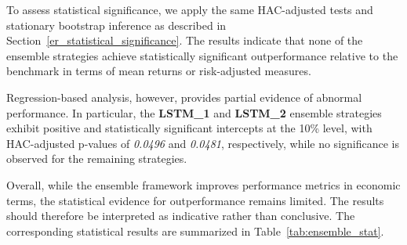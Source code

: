 \documentclass[]{elsarticle}
\begin{document}
\linespread{1.5}\selectfont

To assess statistical significance, we apply the same HAC-adjusted tests and stationary bootstrap inference as described in Section~\ref{er_statistical_significance}. The results indicate that none of the ensemble strategies achieve statistically significant outperformance relative to the benchmark in terms of mean returns or risk-adjusted measures.

Regression-based analysis, however, provides partial evidence of abnormal performance. In particular, the \textbf{LSTM\_1} and \textbf{LSTM\_2} ensemble strategies exhibit positive and statistically significant intercepts at the 10\% level, with HAC-adjusted p-values of \emph{0.0496} and \emph{0.0481}, respectively, while no significance is observed for the remaining strategies.

Overall, while the ensemble framework improves performance metrics in economic terms, the statistical evidence for outperformance remains limited. The results should therefore be interpreted as indicative rather than conclusive. The corresponding statistical results are summarized in Table~\ref{tab:ensemble_stat}.
\end{document}
